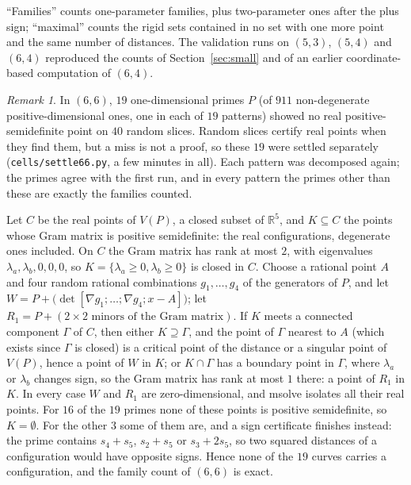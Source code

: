 \documentclass[11pt]{amsart}
\theoremstyle{remark}
\newtheorem{remark}[theorem]{Remark}
\newcommand{\R}{\mathbb{R}}
\begin{document}
\noindent ``Families'' counts one-parameter families, plus two-parameter ones after the plus sign;
``maximal'' counts the rigid sets contained in no set with one more point and the same number of distances.
The validation runs on $(5,3)$, $(5,4)$ and $(6,4)$ reproduced the counts of Section~\ref{sec:small} and of
an earlier coordinate-based computation of $(6,4)$.

\begin{remark}\label{rem:66}
In $(6,6)$, $19$ one-dimensional primes $P$ (of $911$ non-degenerate positive-dimensional ones, one in each of
$19$ patterns) showed no real positive-semidefinite point on $40$ random slices. Random slices certify real
points when they find them, but a miss is not a proof, so these $19$ were settled separately
(\texttt{cells/settle66.py}, a few minutes in all). Each pattern was decomposed again; the primes agree with the
first run, and in every pattern the primes other than these are exactly the families counted.

Let $C$ be the real points of $V(P)$, a closed subset of $\R^5$, and $K\subseteq C$ the points whose Gram
matrix is positive semidefinite: the real configurations, degenerate ones included. On $C$ the Gram matrix
has rank at most $2$, with eigenvalues $\lambda_a,\lambda_b,0,0,0$, so $K=\{\lambda_a\ge0,\lambda_b\ge0\}$ is
closed in $C$. Choose a rational point $A$ and four random rational combinations $g_1,\dots,g_4$ of the
generators of $P$, and let $W=P+\bigl(\det[\nabla g_1;\dots;\nabla g_4;x-A]\bigr)$; let
$R_1=P+(2\times2 \text{ minors of the Gram matrix})$. If $K$ meets a connected component $\Gamma$ of $C$, then
either $K\supseteq\Gamma$, and the point of $\Gamma$ nearest to $A$ (which exists since $\Gamma$ is closed) is a
critical point of the distance or a singular point of $V(P)$, hence a point of $W$ in $K$; or $K\cap\Gamma$ has a
boundary point in $\Gamma$, where $\lambda_a$ or $\lambda_b$ changes sign, so the Gram matrix has rank at most $1$
there: a point of $R_1$ in $K$. In every case $W$ and $R_1$ are zero-dimensional, and msolve isolates all their
real points. For $16$ of the $19$ primes none of these points is positive semidefinite, so $K=\emptyset$. For
the other $3$ some of them are, and a sign certificate finishes instead: the prime
contains $s_4+s_5$, $s_2+s_5$ or $s_3+2s_5$, so two squared distances of a configuration would have opposite
signs. Hence none of the $19$ curves carries a configuration, and the family count of $(6,6)$ is exact.
\end{remark}
\end{document}
